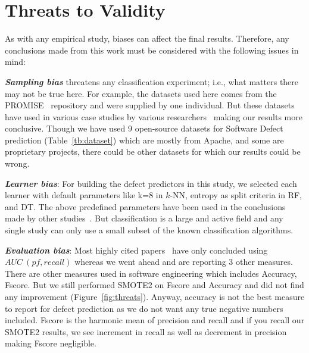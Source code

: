 \documentclass[10pt,conference]{IEEEtran}
\theoremstyle{break}
\theoremstyle{break}
\begin{document}



\section{Threats to Validity}
\label{sect:validity}

As with any empirical study, biases can affect the final
results. Therefore, any conclusions made from this work must be considered with the following issues in mind:

\textbf{\textit{Sampling bias}} threatens any classification experiment; i.e., what matters there may not be true here. For example, the datasets used here comes from the PROMISE~\cite{promiserepo} repository and were supplied by one individual. But these datasets have used in various case studies by various researchers~\cite{he2012investigation,peters2013better,peters2013balancing,turhan2013empirical} making our results more conclusive.
Though we have used 9 open-source datasets for Software Defect prediction (Table~\ref{tb:dataset}) which are mostly from Apache, and some are proprietary projects, there could be other datasets for which our results could be wrong.

\textbf{\textit{Learner bias}}: For building the defect predictors in this
study, we selected each learner with default parameters like k=8 in $k$-NN, entropy as split criteria in RF, and DT. The above predefined parameters have been used in the conclusions made by other studies~\cite{ghotra2015revisiting,tantithamthavorn2016automated}. But classification is a large and active field and any single study can only use a small subset of the known classification algorithms.

\textbf{\textit{Evaluation bias}}: Most highly cited papers~\cite{ghotra2015revisiting,tantithamthavorn2016automated} have only concluded using $AUC\ (pf, recall)$ whereas we went ahead and are reporting 3 other measures. There are other measures used in software engineering which includes Accuracy, Fscore. But we still performed SMOTE2 on Fscore and Accuracy and did not find any improvement (Figure~\ref{fig:threats}). Anyway, accuracy is not the best measure to report for defect prediction as we do not want any true negative numbers included. Fscore is the harmonic mean of precision and recall and if you recall our SMOTE2 results, we see  increment in recall as well as  decrement in precision making Fscore negligible.
\end{document}
